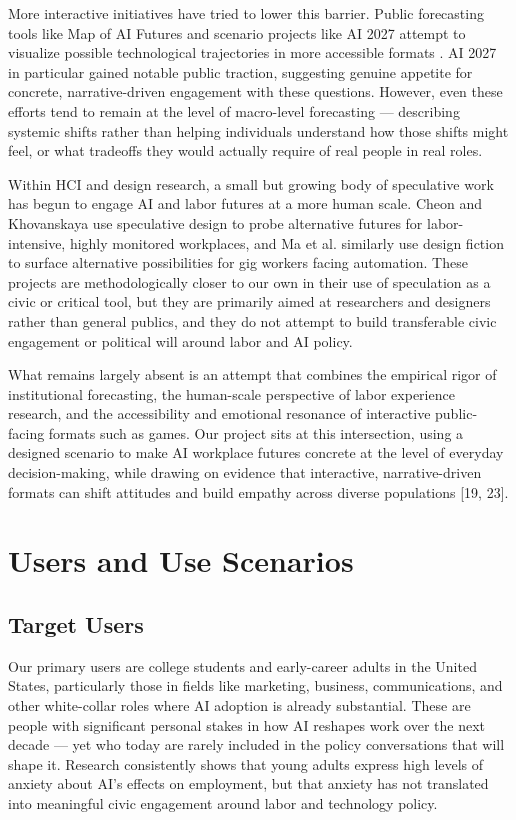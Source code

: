 \documentclass[sigconf,authordraft]{acmart}
\begin{document}
More interactive initiatives have tried to lower this barrier. Public forecasting tools like Map of AI Futures and scenario projects like AI 2027 attempt to visualize possible technological trajectories in more accessible formats \cite{ai2027}. AI 2027 in particular gained notable public traction, suggesting genuine appetite for concrete, narrative-driven engagement with these questions. However, even these efforts tend to remain at the level of macro-level forecasting — describing systemic shifts rather than helping individuals understand how those shifts might feel, or what tradeoffs they would actually require of real people in real roles.

Within HCI and design research, a small but growing body of speculative work has begun to engage AI and labor futures at a more human scale. Cheon and Khovanskaya \cite{cheon2024amazon} use speculative design to probe alternative futures for labor-intensive, highly monitored workplaces, and Ma et al. \cite{ma2025speculative} similarly use design fiction to surface alternative possibilities for gig workers facing automation. These projects are methodologically closer to our own in their use of speculation as a civic or critical tool, but they are primarily aimed at researchers and designers rather than general publics, and they do not attempt to build transferable civic engagement or political will around labor and AI policy.

What remains largely absent is an attempt that combines the empirical rigor of institutional forecasting, the human-scale perspective of labor experience research, and the accessibility and emotional resonance of interactive public-facing formats such as games. Our project sits at this intersection, using a designed scenario to make AI workplace futures concrete at the level of everyday decision-making, while drawing on evidence that interactive, narrative-driven formats can shift attitudes and build empathy across diverse populations [19, 23].



\section{Users and Use Scenarios}


\subsection{Target Users}

Our primary users are college students and early-career adults in the United States, particularly those in fields like marketing, business, communications, and other white-collar roles where AI adoption is already substantial. These are people with significant personal stakes in how AI reshapes work over the next decade — yet who today are rarely included in the policy conversations that will shape it. Research consistently shows that young adults express high levels of anxiety about AI's effects on employment, but that anxiety has not translated into meaningful civic engagement around labor and technology policy. 
\end{document}
